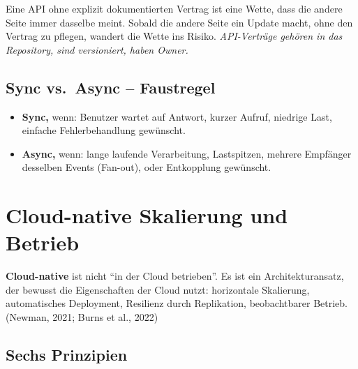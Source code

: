 \documentclass[11pt,a4paper,oneside]{article}
\newcommand{\fachbegriff}[1]{\textbf{#1}}
\newcommand{\quelle}[1]{{\footnotesize\color{lpGray}(#1)}}
\begin{document}
\medskip

\begin{merkbox}
Eine API ohne explizit dokumentierten Vertrag ist eine Wette, dass die andere Seite immer dasselbe meint. Sobald die andere Seite ein Update macht, ohne den Vertrag zu pflegen, wandert die Wette ins Risiko. \emph{API-Verträge gehören in das Repository, sind versioniert, haben Owner.}
\end{merkbox}

\subsection{Sync vs.\ Async -- Faustregel}

\begin{itemize}
  \item \textbf{Sync,} wenn: Benutzer wartet auf Antwort, kurzer Aufruf, niedrige Last, einfache Fehlerbehandlung gewünscht.
  \item \textbf{Async,} wenn: lange laufende Verarbeitung, Lastspitzen, mehrere Empfänger desselben Events (Fan-out), oder Entkopplung gewünscht.
\end{itemize}

\section{Cloud-native Skalierung und Betrieb}

\fachbegriff{Cloud-native} ist nicht ``in der Cloud betrieben''. Es ist ein Architekturansatz, der bewusst die Eigenschaften der Cloud nutzt: horizontale Skalierung, automatisches Deployment, Resilienz durch Replikation, beobachtbarer Betrieb. \quelle{Newman, 2021; Burns et al., 2022}

\subsection{Sechs Prinzipien}
\end{document}
